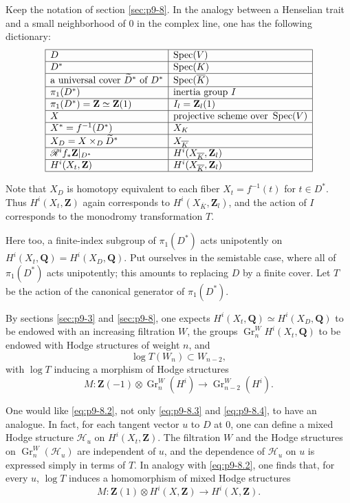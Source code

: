 \documentclass[11pt]{amsart}
\theoremstyle{plain}
\theoremstyle{definition}
\theoremstyle{remark}
\DeclareMathOperator{\Gr}{Gr}
\DeclareMathOperator{\Spec}{Spec}
\newcommand{\Q}{\mathbf{Q}}
\newcommand{\Z}{\mathbf{Z}}
\begin{document}
Keep the notation of section \ref{sec:p9-8}. In the analogy between a Henselian trait and a small neighborhood of $0$ in the complex line, one has the following dictionary:
\[
\begin{array}{|l|l|}
\hline
D&\Spec(V)\\
\hline
D^*&\Spec(K)\\
\hline
\text{a universal cover }\widetilde D^*\text{ of }D^*&\Spec(\overline K)\\
\hline
\pi_1(D^*)&\text{inertia group }I\\
\hline
\pi_1(D^*)=\Z\simeq\Z(1)&I_l=\Z_l(1)\\
\hline
X&\text{projective scheme over }\Spec(V)\\
\hline
X^*=f^{-1}(D^*)&X_K\\
\hline
X_D=X\times_D\widetilde D^*&X_{\overline K}\\
\hline
\mathscr R^if_*\Z|_{D^*}&H^i(X_{\overline K},\Z_l)\\
\hline
H^i(X_t,\Z)&H^i(X_{\overline K},\Z_l)\\
\hline
\end{array}
\]

Note that $X_D$ is homotopy equivalent to each fiber $X_t=f^{-1}(t)$ for $t\in D^*$. Thus $H^i(X_t,\Z)$ again corresponds to $H^i(X_{\overline K},\Z_l)$, and the action of $I$ corresponds to the monodromy transformation $T$.

Here too, a finite-index subgroup of $\pi_1(D^*)$ acts unipotently on $H^i(X_t,\Q)=H^i(X_D,\Q)$. Put ourselves in the semistable case, where all of $\pi_1(D^*)$ acts unipotently; this amounts to replacing $D$ by a finite cover. Let $T$ be the action of the canonical generator of $\pi_1(D^*)$.

By sections \ref{sec:p9-3} and \ref{sec:p9-8}, one expects $H^i(X_t,\Q)\simeq H^i(X_D,\Q)$ to be endowed with an increasing filtration $W$, the groups $\Gr_n^W H^i(X_t,\Q)$ to be endowed with Hodge structures of weight $n$, and
\[
\log T(W_n)\subset W_{n-2},
\]
with $\log T$ inducing a morphism of Hodge structures
\[
M:\Z(-1)\otimes\Gr_n^W(H^i)\to \Gr_{n-2}^W(H^i).
\]

One would like \eqref{eq:p9-8.2}, not only \eqref{eq:p9-8.3} and \eqref{eq:p9-8.4}, to have an analogue. In fact, for each tangent vector $u$ to $D$ at $0$, one can define a mixed Hodge structure $\mathscr H_u$ on $H^i(X_t,\Z)$. The filtration $W$ and the Hodge structures on $\Gr_n^W(\mathscr H_u)$ are independent of $u$, and the dependence of $\mathscr H_u$ on $u$ is expressed simply in terms of $T$. In analogy with \eqref{eq:p9-8.2}, one finds that, for every $u$, $\log T$ induces a homomorphism of mixed Hodge structures
\[
M:\Z(1)\otimes H^i(X,\Z)\to H^i(X,\Z).
\]
\end{document}

